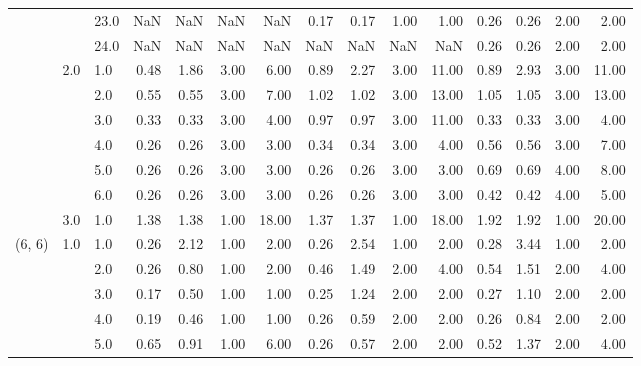 \begin{tabular}{lllrrrrrrrrrrrr}
       &     & 23.0 &        NaN &       NaN &  NaN &    NaN &       0.17 &      0.17 &  1.00 &   1.00 &       0.26 &      0.26 &  2.00 &   2.00 \\
       &     & 24.0 &        NaN &       NaN &  NaN &    NaN &        NaN &       NaN &   NaN &    NaN &       0.26 &      0.26 &  2.00 &   2.00 \\
       & 2.0 & 1.0  &       0.48 &      1.86 & 3.00 &   6.00 &       0.89 &      2.27 &  3.00 &  11.00 &       0.89 &      2.93 &  3.00 &  11.00 \\
       &     & 2.0  &       0.55 &      0.55 & 3.00 &   7.00 &       1.02 &      1.02 &  3.00 &  13.00 &       1.05 &      1.05 &  3.00 &  13.00 \\
       &     & 3.0  &       0.33 &      0.33 & 3.00 &   4.00 &       0.97 &      0.97 &  3.00 &  11.00 &       0.33 &      0.33 &  3.00 &   4.00 \\
       &     & 4.0  &       0.26 &      0.26 & 3.00 &   3.00 &       0.34 &      0.34 &  3.00 &   4.00 &       0.56 &      0.56 &  3.00 &   7.00 \\
       &     & 5.0  &       0.26 &      0.26 & 3.00 &   3.00 &       0.26 &      0.26 &  3.00 &   3.00 &       0.69 &      0.69 &  4.00 &   8.00 \\
       &     & 6.0  &       0.26 &      0.26 & 3.00 &   3.00 &       0.26 &      0.26 &  3.00 &   3.00 &       0.42 &      0.42 &  4.00 &   5.00 \\
       & 3.0 & 1.0  &       1.38 &      1.38 & 1.00 &  18.00 &       1.37 &      1.37 &  1.00 &  18.00 &       1.92 &      1.92 &  1.00 &  20.00 \\
(6, 6) & 1.0 & 1.0  &       0.26 &      2.12 & 1.00 &   2.00 &       0.26 &      2.54 &  1.00 &   2.00 &       0.28 &      3.44 &  1.00 &   2.00 \\
       &     & 2.0  &       0.26 &      0.80 & 1.00 &   2.00 &       0.46 &      1.49 &  2.00 &   4.00 &       0.54 &      1.51 &  2.00 &   4.00 \\
       &     & 3.0  &       0.17 &      0.50 & 1.00 &   1.00 &       0.25 &      1.24 &  2.00 &   2.00 &       0.27 &      1.10 &  2.00 &   2.00 \\
       &     & 4.0  &       0.19 &      0.46 & 1.00 &   1.00 &       0.26 &      0.59 &  2.00 &   2.00 &       0.26 &      0.84 &  2.00 &   2.00 \\
       &     & 5.0  &       0.65 &      0.91 & 1.00 &   6.00 &       0.26 &      0.57 &  2.00 &   2.00 &       0.52 &      1.37 &  2.00 &   4.00 \\

\end{tabular}
